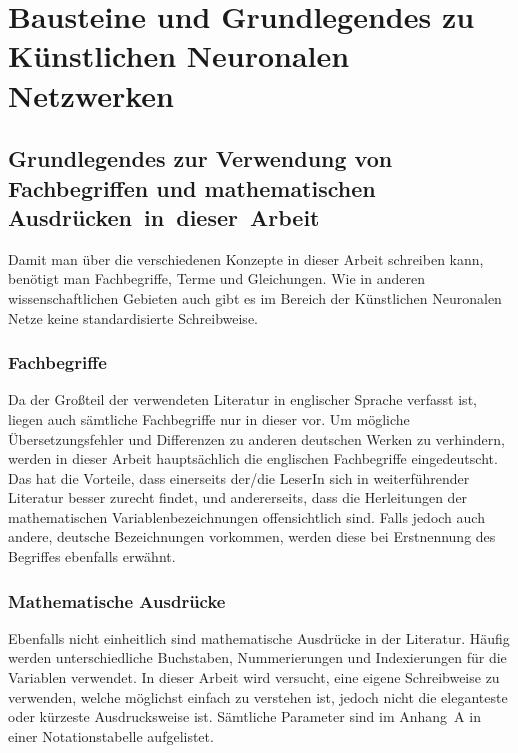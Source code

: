 \documentclass[a4paper,12pt,ngerman,oneside]{scrreprt}	%
\begin{document}
	



	\chapter{Bausteine und Grundlegendes zu Künstlichen Neuronalen Netzwerken}\label{BausteineGrundlegendes}
		\section{Grundlegendes zur Verwendung von Fachbegriffen und mathematischen \mbox{Ausdrücken in dieser Arbeit}}\label{Fachbegriffe&Mathe}
		Damit man über die verschiedenen Konzepte in dieser Arbeit schreiben kann, benötigt man Fachbegriffe, Terme und Gleichungen. Wie in anderen wissenschaftlichen Gebieten auch gibt es im Bereich der Künstlichen Neuronalen Netze keine standardisierte Schreibweise. 
			\subsection{Fachbegriffe}\label{Fachbegriffe}
			Da der Großteil der verwendeten Literatur in englischer Sprache verfasst ist, liegen auch sämtliche Fachbegriffe nur in dieser vor. Um mögliche Übersetzungsfehler und Differenzen zu anderen deutschen Werken zu verhindern, werden in dieser Arbeit hauptsächlich die englischen Fachbegriffe eingedeutscht. Das hat die Vorteile, dass einerseits der/die LeserIn sich in weiterführender Literatur besser zurecht findet, und andererseits, dass die Herleitungen der mathematischen Variablenbezeichnungen offensichtlich sind. Falls jedoch auch andere, deutsche Bezeichnungen vorkommen, werden diese bei Erstnennung des Begriffes ebenfalls erwähnt.
			
			\subsection{Mathematische Ausdrücke}\label{Mathe}
			Ebenfalls nicht einheitlich sind mathematische Ausdrücke in der Literatur. Häufig werden unterschiedliche Buchstaben, Nummerierungen und Indexierungen für die Variablen verwendet. In dieser Arbeit wird versucht, eine eigene Schreibweise zu verwenden, welche möglichst einfach zu verstehen ist, jedoch nicht die eleganteste oder kürzeste Ausdrucksweise ist. Sämtliche Parameter sind im \mbox{Anhang A} in einer Notationstabelle aufgelistet. 
			
\end{document}
